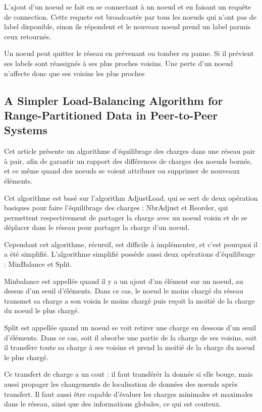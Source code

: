 \documentclass{article}
\begin{document}
L'ajout d'un noeud se fait en se connectant à un noeud et en faisant un requête de connection. Cette requete
est broadcastée par tous les noeuds qui n'ont pas de label disponible, sinon ils répondent et le nouveau
noeud prend un label parmis ceux retournés.

Un noeud peut quitter le réseau en prévenant ou tomber en panne. Si il prévient ses labels sont réassignés à
ses plus proches voisins. Une perte d'un noeud n'affecte donc que ses voisins les plus proches

\subsection{A Simpler Load-Balancing Algorithm for Range-Partitioned Data in Peer-to-Peer Systems
\cite{Chawachat:2015:SLA:2885370.2885376}
}
Cet article présente un algorithme d'équilibrage des charges dans une réseau pair à pair, afin de
garantir un rapport des différences de charges des noeuds bornés, et ce même quand des noeuds se
voient attribuer ou supprimer de nouveaux éléments.

Cet algorithme est basé sur l'algorithm AdjustLoad, qui se sert de deux opération basiques pour faire
l'équilibrage des charges : NbrAdjust et Reorder, qui permettent respectivement de partager la charge
avec un noeud voisin et de se déplacer dans le réseau pour partager la charge d'un noeud.

Cependant cet algorithme, récursif, est difficile à implémenter, et c'est pourquoi il a été simplifié.
L'algorithme simplifié possède aussi deux opérations d'équilibrage : MinBalance et Split.

Minbalance est appellée quand il y a un ajout d'un élément sur un noeud, au dessus d'un seuil d'éléments. Dans
ce cas, le noeud le moins chargé du réseau transmet sa charge a son voisin le moins chargé puis reçoit la moitié
de la charge du noeud le plus chargé.

Split est appellée quand un noeud se voit retirer une charge en dessous d'un seuil d'éléments. Dans ce cas, soit il
absorbe une partie de la charge de ses voisins, soit il transfère toute sa charge à ses voisins et prend la moitié
de la charge du noeud le plus chargé.

Ce transfert de charge a un cout : il faut transférér la donnée si elle bouge, mais aussi propager
les changements de localisation de données des noeuds après transfert. Il faut aussi être capable d'évaluer
les charges minimales et maximales dans le réseau, ainsi que des informations globales, ce qui est couteux.
\end{document}
